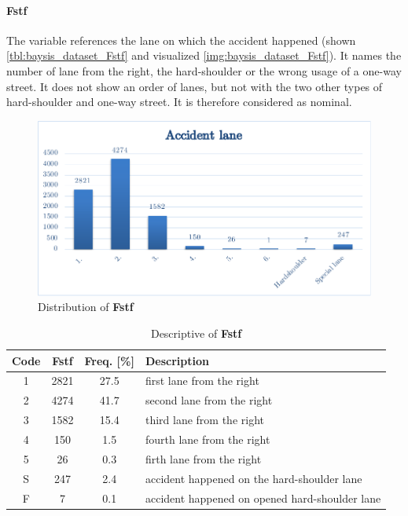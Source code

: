 \paragraph{Fstf}
\label{baysis_dataset_Fstf}
The variable references the lane on which the accident happened (shown \autoref{tbl:baysis_dataset_Fstf} and visualized \autoref{img:baysis_dataset_Fstf}). It names the number of lane from the right, the hard-shoulder or the wrong usage of a one-way street. It does not show an order of lanes, but not with the two other types of hard-shoulder and one-way street. It is therefore considered as nominal.
\begin{figure}[ht]
	\centering
	\includegraphics[scale=0.75]{images/baysis_dataset_Fstf.pdf}
	\caption{Distribution of \textbf{Fstf}}
	\label{img:baysis_dataset_Fstf}
\end{figure}
\begin{table}[ht]
	\centering
	\small
	\begin{tabular}{c|c|c|l}
		\toprule
		Code & \textbf{Fstf} & Freq. [\%] & Description \\ 
		\midrule  
		1 & 2821 	& 27.5 	& first lane from the right \\
		2 & 4274 	& 41.7 	& second lane from the right \\
		3 & 1582 	& 15.4 	& third lane from the right \\
		4 & 150 	& 1.5 	& fourth lane from the right \\
		5 & 26 		& 0.3 	& firth lane from the right \\ 
 		S & 247 	& 2.4 	& accident happened on the hard-shoulder lane \\ 
		F & 7 		& 0.1 	& accident happened on opened hard-shoulder lane \\
		\bottomrule
	\end{tabular}
	\caption{Descriptive of \textbf{Fstf}}
	\label{tbl:baysis_dataset_Fstf}
	\vspace{-8mm}
\end{table}
    
